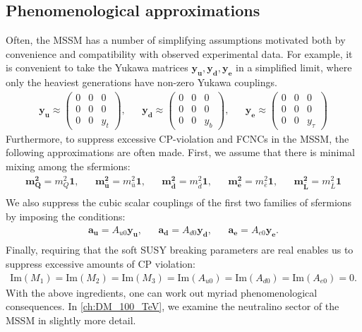 \subsection{Phenomenological approximations}
Often, the MSSM has a number of simplifying assumptions motivated both by convenience and compatibility with observed experimental data. For example, it is convenient to take the Yukawa matrices $\mathbf{y_u,y_d,y_e}$ in a simplified limit, where only the heaviest generations have non-zero Yukawa couplings. 
\begin{align*}
  \mathbf{y_u} \approx \begin{pmatrix}
    0 & 0 & 0\\
    0 & 0 & 0\\
    0 & 0 & y_t
  \end{pmatrix},&&
  \mathbf{y_d} \approx \begin{pmatrix}
    0 & 0 & 0\\
    0 & 0 & 0\\
    0 & 0 & y_b
  \end{pmatrix},&&
  \mathbf{y_e} \approx \begin{pmatrix}
    0 & 0 & 0\\
    0 & 0 & 0\\
    0 & 0 & y_\tau
  \end{pmatrix}
\end{align*}
Furthermore, to suppress excessive CP-violation and FCNCs in the MSSM, the following approximations are often made. First, we assume that there is minimal mixing among the sfermions:
\begin{align*}
  \mathbf{m_Q^2} = m_Q^2\mathbf{1},&&
  \mathbf{m_{\bar{u}}^2} = m_{\bar{u}}^2\mathbf{1},&&
  \mathbf{m_{\bar{d}}^2} = m_{\bar{d}}^2\mathbf{1},&&
  \mathbf{m_{\bar{e}}^2} = m_{\bar{e}}^2\mathbf{1},&&
  \mathbf{m_{\bar{L}}^2} = m_{\bar{L}}^2\mathbf{1}\\
\end{align*}
We also suppress the cubic scalar couplings of the first two families of sfermions by imposing the conditions: 
\begin{align*}
  \mathbf{a_u} = A_{u0}\mathbf{y_u},&&
  \mathbf{a_d} = A_{d0}\mathbf{y_d},&&
  \mathbf{a_e} = A_{e0}\mathbf{y_e}.\\
\end{align*}
Finally, requiring that the soft SUSY breaking parameters are real enables us to suppress excessive amounts of CP violation:
\begin{align*}
  \text{Im}(M_1)=
  \text{Im}(M_2)=
  \text{Im}(M_3)=
  \text{Im}(A_{u0})=
  \text{Im}(A_{d0})=
  \text{Im}(A_{e0})=0.
\end{align*}
With the above ingredients, one can work out myriad phenomenological consequences. In \autoref{ch:DM_100_TeV}, we examine the neutralino sector of the MSSM in slightly more detail.

